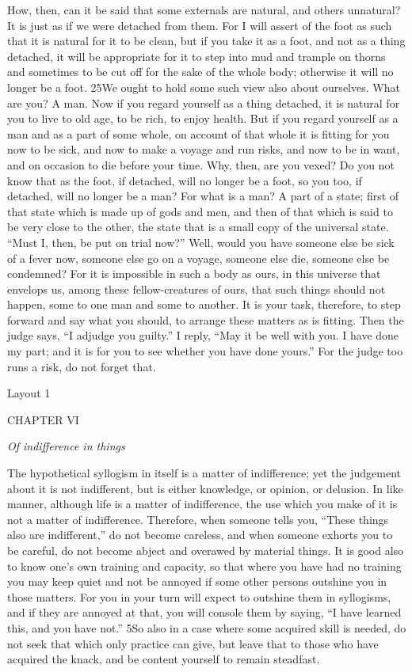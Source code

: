 How, then, can it be said that some externals are natural, and others unnatural? It is just as if we were detached from them. For I will assert of the foot as such that it is natural for it to be clean, but if you take it as a foot, and not as a thing detached, it will be appropriate for it to step into mud and trample on thorns and sometimes to be cut off for the sake of the whole body; otherwise it will no longer be a foot. 25We ought to hold some such view also about ourselves. What are you? A man. Now if you regard yourself as a thing detached, it is natural for you to live to old age, to be rich, to enjoy health. But if you regard yourself as a man and as a part of some whole, on account of that whole it is fitting for you now to be sick, and now to make a voyage and run risks, and now to be in want, and on occasion to die before your time. Why, then, are you vexed? Do you not know that as the foot, if detached, will no longer be a foot, so you too, if detached, will no longer be a man? For what is a man? A part of a state; first of that state which is made up of gods and men, and then of that which is said to be very close to the other, the state that is a small copy of the universal state. ``Must I, then, be put on trial now?'' Well, would you have someone else be sick of a fever now, someone else go on a voyage, someone else die, someone else be condemned? For it is impossible in such a body as ours, in this universe that envelops us, among these fellow-creatures of ours, that such things should not happen, some to one man and some to another. It is your task, therefore, to step forward and say what you should, to arrange these matters as is fitting. Then the judge says, ``I adjudge you guilty.'' I reply, ``May it be well with you. I have done my part; and it is for you to see whether you have done yours.'' For the judge too runs a risk, do not forget that.



Layout 1

CHAPTER VI

\emph{Of indifference in things}

The hypothetical syllogism in itself is a matter of indifference; yet the judgement about it is not indifferent, but is either knowledge, or opinion, or delusion. In like manner, although life is a matter of indifference, the use which you make of it is not a matter of indifference. Therefore, when someone tells you, ``These things also are indifferent,'' do not become careless, and when someone exhorts you to be careful, do not become abject and overawed by material things. It is good also to know one's own training and capacity, so that where you have had no training you may keep quiet and not be annoyed if some other persons outshine you in those matters. For you in your turn will expect to outshine them in syllogisms, and if they are annoyed at that, you will console them by saying, ``I have learned this, and you have not.'' 5So also in a case where some acquired skill is needed, do not seek that which only practice can give, but leave that to those who have acquired the knack, and be content yourself to remain steadfast.

